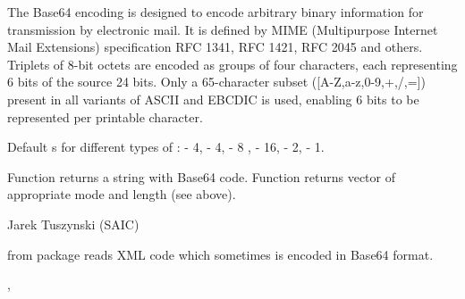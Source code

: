 \begin{Details}\relax
The Base64 encoding is designed to encode arbitrary binary information for 
transmission by electronic mail. It is defined by MIME (Multipurpose Internet 
Mail Extensions) specification RFC 1341, RFC 1421, RFC 2045 and others. 
Triplets of 8-bit octets are encoded as groups of four characters, each 
representing 6 bits of the source 24 bits. Only a 65-character subset 
([A-Z,a-z,0-9,+,/,=]) present in all variants of ASCII and EBCDIC is used, 
enabling 6 bits to be represented per printable character.

Default s for different types of :  - 4, 
 - 4,  - 8 ,  - 16, 
 - 2,  - 1.
\end{Details}
\begin{Value}
Function  returns a string with Base64 code.
Function  returns vector of appropriate mode 
and length (see  above).
\end{Value}
\begin{Author}\relax
Jarek Tuszynski (SAIC) 
\end{Author}
\begin{References}\relax
{}
\end{References}
\begin{SeeAlso}\relax
{} from  package reads XML code
which sometimes is encoded in Base64 format.

, 
\end{SeeAlso}
